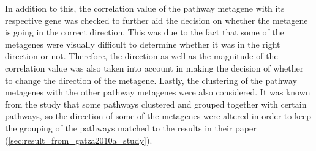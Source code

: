 In addition to this, the correlation value of the pathway metagene with its respective gene was checked to further aid the decision on whether the metagene is going in the correct direction.
This was due to the fact that some of the metagenes were visually difficult to determine whether it was in the right direction or not.
Therefore, the direction as well as the magnitude of the correlation value was also taken into account in making the decision of whether to change the direction of the metagene.
Lastly, the clustering of the pathway metagenes with the other pathway metagenes were also considered.
It was known from the \citet{Gatza2010a} study that some pathways clustered and grouped together with certain pathways, so the direction of some of the metagenes were altered in order to keep the grouping of the pathways matched to the results in their paper (\cref{sec:result_from_gatza2010a_study}).

